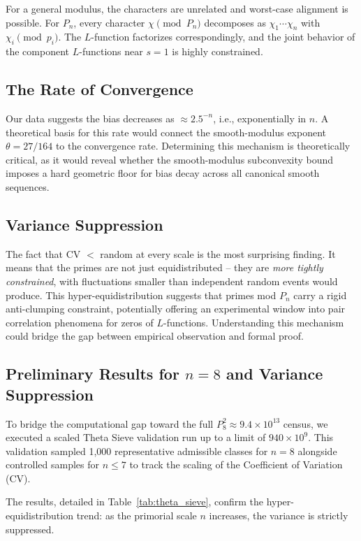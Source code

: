 \documentclass[11pt]{article}
\begin{document}
For a general modulus, the characters are unrelated and worst-case
alignment is possible. For $P_n$, every character $\chi \pmod{P_n}$
decomposes as $\chi_1 \cdots \chi_n$ with $\chi_i \pmod{p_i}$. The
$L$-function factorizes correspondingly, and the joint behavior of the
component $L$-functions near $s=1$ is highly constrained.

\subsection{The Rate of Convergence}

Our data suggests the bias decreases as $\approx 2.5^{-n}$, i.e.,
exponentially in $n$. A theoretical basis for this rate would connect
the smooth-modulus exponent $\theta = 27/164$ to the convergence rate.
Determining this mechanism is theoretically critical, as it would reveal
whether the smooth-modulus subconvexity bound imposes a hard geometric
floor for bias decay across all canonical smooth sequences.

\subsection{Variance Suppression}

The fact that CV $<$ random at every scale is the most surprising finding.
It means that the primes are not just equidistributed -- they are
\emph{more tightly constrained}, with fluctuations smaller than independent
random events would produce. This hyper-equidistribution suggests that
primes mod $P_n$ carry a rigid anti-clumping constraint, potentially
offering an experimental window into pair correlation
phenomena for zeros of $L$-functions. Understanding this mechanism
could bridge the gap between empirical observation and formal proof.

\subsection{Preliminary Results for $n=8$ and Variance Suppression}

To bridge the computational gap toward the full $P_8^2 \approx 9.4 \times 10^{13}$ census, we executed a scaled Theta Sieve validation run up to a limit of $940 \times 10^9$. This validation sampled 1,000 representative admissible classes for $n=8$ alongside controlled samples for $n \leq 7$ to track the scaling of the Coefficient of Variation (CV).

The results, detailed in Table~\ref{tab:theta_sieve}, confirm the hyper-equidistribution trend: as the primorial scale $n$ increases, the variance is strictly suppressed.
\end{document}
